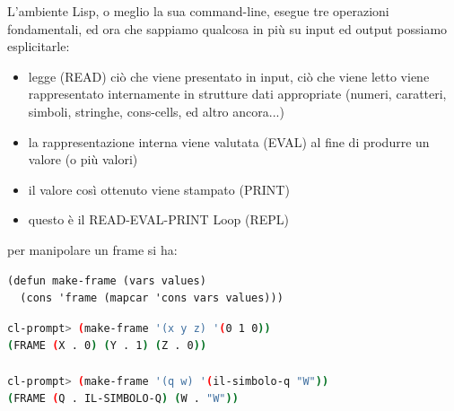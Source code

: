 \documentclass[a4paper,12pt, oneside]{book}
\begin{document}
L'ambiente Lisp, o meglio la sua command-line, esegue tre operazioni fondamentali, ed ora che sappiamo qualcosa in più su input ed output possiamo esplicitarle:
\begin{itemize}
	\item legge (READ) ciò che viene presentato in input, ciò che viene letto viene rappresentato internamente in strutture dati appropriate (numeri, caratteri, simboli, stringhe, cons-cells, ed altro ancora...)
	\item la rappresentazione interna viene valutata (EVAL) al fine di produrre un valore (o più valori)
	\item il valore così ottenuto viene stampato (PRINT)
	\item questo è il READ-EVAL-PRINT Loop (REPL)
\end{itemize}
per manipolare un frame si ha:
\begin{verbatim}
(defun make-frame (vars values)
  (cons 'frame (mapcar 'cons vars values)))
\end{verbatim}
\begin{shaded}
	\begin{lstlisting}[language=bash]
cl-prompt> (make-frame '(x y z) '(0 1 0))
(FRAME (X . 0) (Y . 1) (Z . 0))

cl-prompt> (make-frame '(q w) '(il-simbolo-q "W"))
(FRAME (Q . IL-SIMBOLO-Q) (W . "W"))
\end{lstlisting}
\end{shaded}
\end{document}
